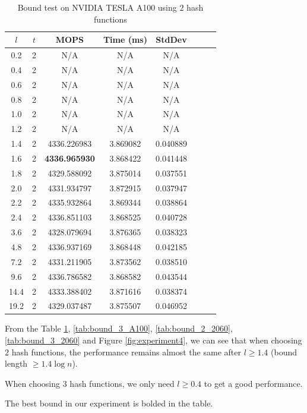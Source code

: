\documentclass[10pt,twocolumn,letterpaper]{article}
\begin{document}
\begin{table}[!h]
    \centering
   \begin{tabular}{@{}c|ccccccc@{}}
\toprule
$l$ & $t$ & MOPS    & Time (ms)& StdDev  \\ \midrule
0.2 & 2 & N/A & N/A & N/A \\
0.4 & 2 & N/A & N/A & N/A \\
0.6 & 2 & N/A & N/A & N/A \\
0.8 & 2 & N/A & N/A & N/A \\
1.0 & 2 & N/A & N/A & N/A \\
1.2 & 2 & N/A & N/A & N/A \\
1.4 & 2 & 4336.226983 & 3.869082 & 0.040889 \\
1.6 & 2 & \textbf{4336.965930} & 3.868422 & 0.041448 \\
1.8 & 2 & 4329.588092 & 3.875014 & 0.037551 \\
2.0 & 2 & 4331.934797 & 3.872915 & 0.037947 \\
2.2 & 2 & 4335.932864 & 3.869344 & 0.038864 \\
2.4 & 2 & 4336.851103 & 3.868525 & 0.040728 \\
3.6 & 2 & 4328.079694 & 3.876365 & 0.038323 \\
4.8 & 2 & 4336.937169 & 3.868448 & 0.042185 \\
7.2 & 2 & 4331.211905 & 3.873562 & 0.038510 \\
9.6 & 2 & 4336.786582 & 3.868582 & 0.043544 \\
14.4 & 2 & 4333.388402 & 3.871616 & 0.038374 \\
19.2 & 2 & 4329.037487 & 3.875507 & 0.046952 \\
\bottomrule
\end{tabular}
    \caption{Bound test on NVIDIA TESLA A100 using $2$ hash functions}
    \label{tab:bound_2_A100}
\end{table}

\newpage

From the Table \ref{tab:bound_2_A100}, \ref{tab:bound_3_A100}, \ref{tab:bound_2_2060}, \ref{tab:bound_3_2060} and Figure \ref{fig:experiment4}, we can see that when choosing $2$ hash functions, the performance remains almost the same after $l \geq 1.4$ (bound length $\geq 1.4 \log n$).

When choosing $3$ hash functions, we only need $l \geq 0.4$ to get a good performance. 

The best bound in our experiment is bolded in the table.
\end{document}
